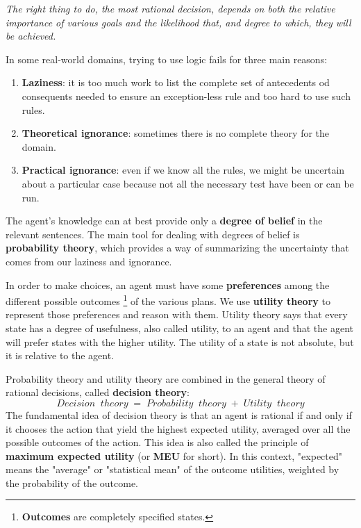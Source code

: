 \documentclass{article}
\begin{document}
\noindent \textit{The right thing to do, the most rational decision, depends on both the relative importance of various goals and the likelihood that, and degree to which, they will be achieved.}

In some real-world domains, trying to use logic fails for three main reasons:
\begin{enumerate}
    \item \textbf{Laziness}: it is too much work to list the complete set of antecedents od consequents needed to ensure an exception-less rule and too hard to use such rules. 
    \item \textbf{Theoretical ignorance}: sometimes there is no complete theory for the domain.
    \item \textbf{Practical ignorance}: even if we know all the rules, we might be uncertain about a particular case because not all the necessary test have been or can be run. 
\end{enumerate}

The agent's knowledge can at best provide only a \textbf{degree of belief} in the relevant sentences. The main tool for dealing with degrees of belief is \textbf{probability theory}, which provides a way of summarizing the uncertainty that comes from our laziness and ignorance.

In order to make choices, an agent must have some \textbf{preferences} among the different possible outcomes \footnote{
\textbf{Outcomes} are completely specified states.} of the various plans. We use \textbf{utility theory} to represent those preferences and reason with them. Utility theory says that every state has a degree of usefulness, also called utility, to an agent and that the agent will prefer states with the higher utility. The utility of a state is not absolute, but it is relative to the agent. 

Probability theory and utility theory are combined in the general theory of rational decisions, called \textbf{decision theory}:
$$Decision\;\; theory \; = \; Probability \;\; theory \; +\; Utility \;\; theory $$
The fundamental idea of decision theory is that an agent is rational if and only if it chooses the action that yield the highest expected utility, averaged over all the possible outcomes of the action. This idea is also called the principle of \textbf{maximum expected utility} (or \textbf{MEU} for short). In this context, "expected" means the "average" or "statistical mean" of the outcome utilities, weighted by the probability of the outcome. 
\end{document}
